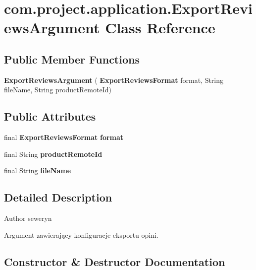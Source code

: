 \section{com.\+project.\+application.\+Export\+Reviews\+Argument Class Reference}
\label{classcom_1_1project_1_1application_1_1_export_reviews_argument}
\subsection*{Public Member Functions}
\begin{DoxyCompactItemize}
\item 
\textbf{ Export\+Reviews\+Argument} (\textbf{ Export\+Reviews\+Format} format, String file\+Name, String product\+Remote\+Id)
\end{DoxyCompactItemize}
\subsection*{Public Attributes}
\begin{DoxyCompactItemize}
\item 
\mbox{\label{classcom_1_1project_1_1application_1_1_export_reviews_argument_a89f95e67feeb41d396deb4d15b914047}} 
final \textbf{ Export\+Reviews\+Format} {\bfseries format}
\item 
\mbox{\label{classcom_1_1project_1_1application_1_1_export_reviews_argument_af473f24ebdbbe8fd16571ec82b3af6da}} 
final String {\bfseries product\+Remote\+Id}
\item 
\mbox{\label{classcom_1_1project_1_1application_1_1_export_reviews_argument_a4745eb6dadd4c8b0825aa1bb945b0077}} 
final String {\bfseries file\+Name}
\end{DoxyCompactItemize}


\subsection{Detailed Description}
\begin{DoxyAuthor}{Author}
seweryn
\end{DoxyAuthor}
Argument zawierający konfiguracje eksportu opini. 

\subsection{Constructor \& Destructor Documentation}
\mbox{\label{classcom_1_1project_1_1application_1_1_export_reviews_argument_a7e990b328de513bc375b7c2088368fbd}} 
